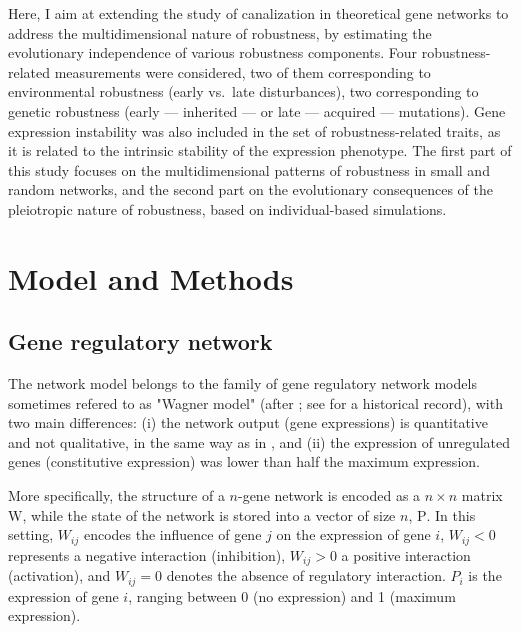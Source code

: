 \documentclass[10pt,a4paper]{article}
\newcommand{\W}{\bm{\mathrm W}}
\newcommand{\Pp}{\bm{\mathrm P}}
\begin{document}
Here, I aim at extending the study of canalization in theoretical gene networks to address the multidimensional nature of robustness, by estimating the evolutionary independence of various robustness components. Four robustness-related measurements were considered, two of them corresponding to environmental robustness (early vs.\ late disturbances), two corresponding to genetic robustness (early --- inherited --- or late --- acquired --- mutations). Gene expression instability was also included in the set of robustness-related traits, as it is related to the intrinsic stability of the expression phenotype. The first part of this study focuses on the multidimensional patterns of robustness in small and random networks, and the second part on the evolutionary consequences of the pleiotropic nature of robustness, based on individual-based simulations. 

\section{Model and Methods}

\subsection{Gene regulatory network}

The network model belongs to the family of gene regulatory network models sometimes refered to as "Wagner model" (after \citealp{Wag94,Wag96}; see \citealp{FP15} for a historical record), with two main differences: (i) the network output (gene expressions) is quantitative and not qualitative, in the same way as in \citet{SB02}, and (ii) the expression of unregulated genes (constitutive expression) was lower than half the maximum expression. 

More specifically, the structure of a $n$-gene network is encoded as a $n\times n$ matrix $\W$, while the state of the network is stored into a vector of size $n$, $\Pp$. In this setting, $W_{ij}$ encodes the influence of gene $j$ on the expression of gene $i$, $W_{ij} < 0$ represents a negative interaction (inhibition), $W_{ij} > 0$ a positive interaction (activation), and $W_{ij} = 0$ denotes the absence of regulatory interaction. $P_i$ is the expression of gene $i$, ranging between 0 (no expression) and 1 (maximum expression). 
\end{document}
